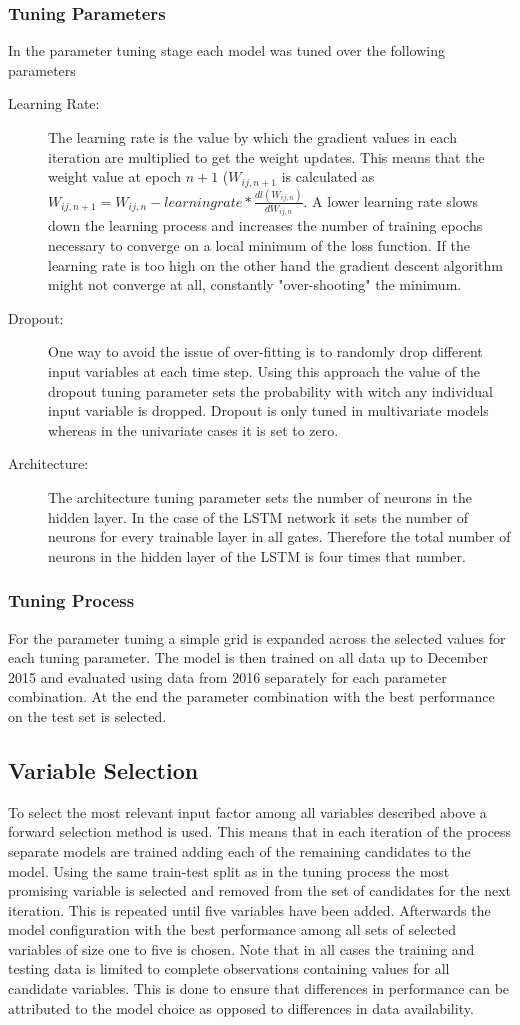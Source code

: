 \subsubsection{Tuning Parameters}
In the parameter tuning stage each model was tuned over the following parameters
\begin{description}
\item[Learning Rate:] The learning rate is the value by which the gradient values in each iteration are multiplied to get the weight updates. This means that the weight value at epoch $n+1$ ($W_{ij, n+1}$ is calculated as $W_{ij, n+1} = W_{ij, n} - learningrate * \frac{dl(W_{ij, n})}{dW_{ij, n}}$. A lower learning rate slows down the learning process and increases the number of training epochs necessary to converge on a local minimum of the loss function. If the learning rate is too high on the other hand the gradient descent algorithm might not converge at all, constantly "over-shooting" the minimum.
\item[Dropout:] One way to avoid the issue of over-fitting is to randomly drop different input variables at each time step. Using this approach the value of the dropout tuning parameter sets the probability with witch any individual input variable is dropped. Dropout is only tuned in multivariate models whereas in the univariate cases it is set to zero.
\item[Architecture:] The architecture tuning parameter sets the number of neurons in the hidden layer. In the case of the LSTM network it sets the number of neurons for every trainable layer in all gates. Therefore the total number of neurons in the hidden layer of the LSTM is four times that number.
\end{description}
\subsubsection{Tuning Process}
For the parameter tuning a simple grid is expanded across the selected values for each tuning parameter. The model is then trained on all data up to December 2015 and evaluated using data from 2016 separately for each parameter combination. At the end the parameter combination with the best performance on the test set is selected.
\subsection{Variable Selection}
To select the most relevant input factor among all variables described above a forward selection method is used. This means that in each iteration of the process separate models are trained adding each of the remaining candidates to the model. Using the same train-test split as in the tuning process the most promising variable is  selected and removed from the set of candidates for the next iteration. This is repeated until five variables have been added. Afterwards the model configuration with the best performance among all sets of selected variables of size one to five is chosen. Note that in all cases the training and testing data is limited to complete observations containing values for all candidate variables. This is done to ensure that differences in performance can be attributed to the model choice as opposed to differences in data availability.
